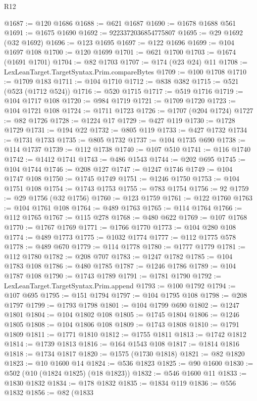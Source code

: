 \begin{lexlean}{R12}
\begin{coremodule}
@1687 := @120 @1686
@1688 := @621 @1687
@1690 := @1678 @1688 @561
@1691 := @1675 @1690
@1692 := 9223372036854775807
@1695 := @29 @1692 (@32 @1692)
@1696 := @123 @1695
@1697 := @122 @1696
@1699 := @104 @1697 @108
@1700 := @120 @1699
@1701 := @621 @1700
@1703 := @1674 (@1691 @1701)
@1704 := @82 @1703
@1707 := @174 (@23 @24) @11
@1708 := LexLeanTarget.TargetSyntax.Prim.compareBytes
@1709 := @100 @1708
@1710 := @1709 @183
@1711 := @104 @1710
@1712 := @838 @382
@1715 := @521 (@523 (@1712 @524))
@1716 := @520 @1715
@1717 := @519 @1716
@1719 := @104 @1717 @108
@1720 := @984 @1719
@1721 := @1709 @1720
@1723 := @104 @1721 @108
@1724 := @1711 @1723
@1726 := @1707 (@204 @1724)
@1727 := @82 @1726
@1728 := @1224 @17
@1729 := @427 @119
@1730 := @1728 @1729
@1731 := @194 @22
@1732 := @805 @119
@1733 := @427 @1732
@1734 := @1731 @1733
@1735 := @805 @1732
@1737 := @104 @1735 @690
@1738 := @114 @1737
@1739 := @112 @1738
@1740 := @107 @510
@1741 := @116 @1740
@1742 := @1412 @1741
@1743 := @486 @1543
@1744 := @202 @695
@1745 := @104 @1744
@1746 := @208 @127
@1747 := @1247 @1746
@1749 := @104 @1747 @108
@1750 := @1745 @1749
@1751 := @1246 @1750
@1753 := @104 @1751 @108
@1754 := @1743 @1753
@1755 := @783 @1754
@1756 := 92
@1759 := @29 @1756 (@32 @1756)
@1760 := @123 @1759
@1761 := @122 @1760
@1763 := @104 @1761 @108
@1764 := @489 @1763
@1765 := @114 @1764
@1766 := @112 @1765
@1767 := @115 @278
@1768 := @480 @622
@1769 := @107 @1768
@1770 := @1767 @1769
@1771 := @1766 @1770
@1773 := @104 @280 @108
@1774 := @489 @1773
@1775 := @1032 @1774
@1777 := @112 @1775 @578
@1778 := @489 @670
@1779 := @114 @1778
@1780 := @1777 @1779
@1781 := @112 @1780
@1782 := @208 @707
@1783 := @1247 @1782
@1785 := @104 @1783 @108
@1786 := @480 @1785
@1787 := @1246 @1786
@1789 := @104 @1787 @108
@1790 := @1743 @1789
@1791 := @1781 @1790
@1792 := LexLeanTarget.TargetSyntax.Prim.append
@1793 := @100 @1792
@1794 := @107 @695
@1795 := @151 @1794
@1797 := @104 @1795 @108
@1798 := @208 @1797
@1799 := @1793 @1798
@1801 := @104 @1799 @690
@1802 := @1247 @1801
@1804 := @104 @1802 @108
@1805 := @1745 @1804
@1806 := @1246 @1805
@1808 := @104 @1806 @108
@1809 := @1743 @1808
@1810 := @1791 @1809
@1811 := @1771 @1810
@1812 := @1755 @1811
@1813 := @1742 @1812
@1814 := @1739 @1813
@1816 := @164 @1543 @108
@1817 := @1814 @1816
@1818 := @1734 @1817
@1820 := @1575 (@1730 @1818)
@1821 := @82 @1820
@1823 := @10 @1600 @14
@1824 := @536 @1823
@1825 := @90 @1600
@1830 := @502 (@10 (@1824 @1825) (@18 @1823))
@1832 := @546 @1600 @11
@1833 := @1830 @1832
@1834 := @178 @1832
@1835 := @1834 @119
@1836 := @556 @1832
@1856 := @82
    (@1833

\end{coremodule}
\end{lexlean}
